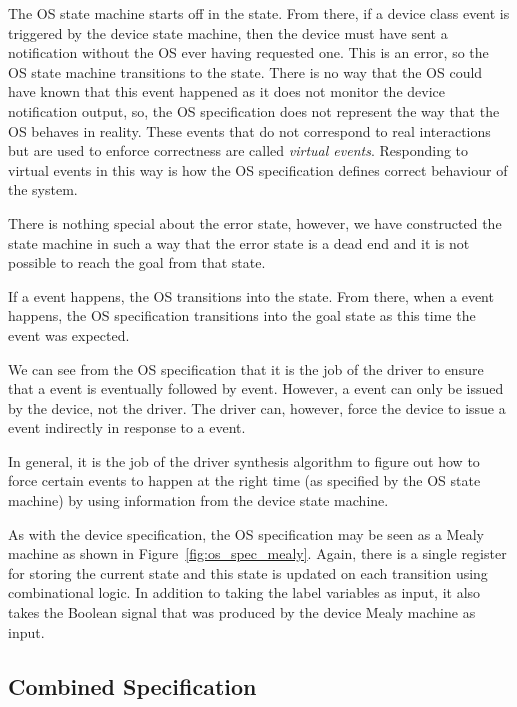 The OS state machine starts off in the  state. From there, if a  device class event is triggered by the device state machine, then the device must have sent a notification without the OS ever having requested one. This is an error, so the OS state machine transitions to the  state. There is no way that the OS could have known that this event happened as it does not monitor the device notification output, so, the OS specification does not represent the way that the OS behaves in reality. These events that do not correspond to real interactions but are used to enforce correctness are called \emph{virtual events}. Responding to virtual events in this way is how the OS specification defines correct behaviour of the system.

There is nothing special about the error state, however, we have constructed the state machine in such a way that the error state is a dead end and it is not possible to reach the goal from that state.

If a  event happens, the OS transitions into the  state. From there, when a  event happens, the OS specification transitions into the goal state as this time the  event was expected. 

We can see from the OS specification that it is the job of the driver to ensure that a  event is eventually followed by  event. However, a  event can only be issued by the device, not the driver. The driver can, however, force the device to issue a  event indirectly in response to a  event. 

In general, it is the job of the driver synthesis algorithm to figure out how to force certain events to happen at the right time (as specified by the OS state machine) by using information from the device state machine. 

As with the device specification, the OS specification may be seen as a Mealy machine as shown in Figure~\ref{fig:os_spec_mealy}. Again, there is a single register for storing the current state and this state is updated on each transition using combinational logic. In addition to taking the label variables as input, it also takes the  Boolean signal that was produced by the device Mealy machine as input. 

\subsection{Combined Specification}

